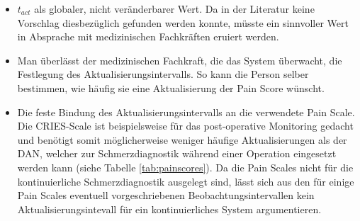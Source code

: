  \begin{itemize}
 \item $t_{act}$ als globaler, nicht veränderbarer Wert. Da in der Literatur keine Vorschlag diesbezüglich gefunden werden konnte, müsste ein sinnvoller Wert in Absprache mit medizinischen Fachkräften eruiert werden. 
 \item Man überlässt der medizinischen Fachkraft, die das System überwacht, die Festlegung des Aktualisierungsintervalls. So kann die Person selber bestimmen, wie häufig sie eine Aktualisierung der Pain Score wünscht.
 \item Die feste Bindung des Aktualisierungsintervalls an die verwendete Pain Scale. Die CRIES-Scale ist beispielsweise für das post-operative Monitoring gedacht und benötigt somit möglicherweise weniger häufige Aktualisierungen als der DAN, welcher zur Schmerzdiagnostik während einer Operation eingesetzt werden kann (siehe Tabelle \ref{tab:painscores}). Da die Pain Scales nicht für die kontinuierliche Schmerzdiagnostik ausgelegt sind, lässt sich aus den für einige Pain Scales eventuell vorgeschriebenen Beobachtungsintervallen kein Aktualisierungsintevall für ein kontinuierliches System argumentieren.
 \end{itemize}

